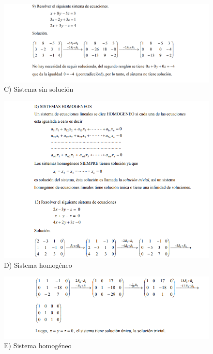 \documentclass[a4paper,10pt]{article}
\begin{document}
\begin{figure}[H]
    \centering
    \includegraphics[width=1\linewidth]{4.png}
    \caption{C) Sistema sin solución}
\end{figure}
\vspace{6em}
\begin{figure}[H]
    \centering
    \includegraphics[width=1\linewidth]{5.png}
    \caption{D) Sistema homogéneo}
\end{figure}

\begin{figure}[H]
    \centering
    \includegraphics[width=1\linewidth]{6.png}
    \caption{E) Sistema homogéneo}
\end{figure}
\end{document}
